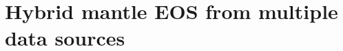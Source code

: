 \documentclass[12pt,notitlepage]{article}
\begin{document}
%

\section{Hybrid mantle EOS from multiple data sources}


%

%




%
%
\end{document}
